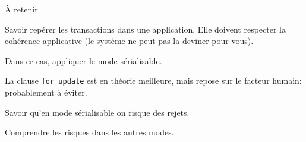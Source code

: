 \begin{frame}{À retenir}

Savoir repérer les transactions dans une application. Elle doivent respecter la 
\alert{cohérence applicative} (le système ne peut pas la deviner pour vous).

\vfill 

Dans ce cas, appliquer le mode sérialisable.

\vfill

La clause \texttt{for update}  est en théorie meilleure, mais repose 
sur le facteur humain: probablement à éviter.

\vfill

Savoir qu'en mode sérialisable on risque des rejets.

\vfill

Comprendre les risques dans les autres modes.

\end{frame}